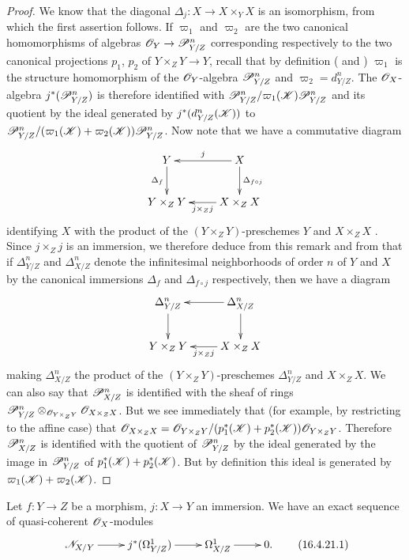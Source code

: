 \begin{proof}
We know  that the diagonal $\Delta_j:X \to X \times_Y X$ is an isomorphism, from which the first assertion follows.
If $\varpi_1$ and $\varpi_2$ are the two canonical homomorphisms of algebras $\sh{O}_Y \to \sh{P}_{Y/Z}^n$ corresponding respectively to the two canonical projections $p_1$, $p_2$ of $Y \times_Z Y \to Y$, recall that by definition ( and ) $\varpi_1$ is the structure homomorphism of the $\mathscr{O}_Y$-algebra $\mathscr{P}_{Y/Z}^n$ and $\varpi_2 = d_{Y/Z}^n$.
The $\mathscr{O}_X$-algebra $j^*(\mathscr{P}_{Y/Z}^n)$ is therefore identified with $\mathscr{P}_{Y/Z}^n/\varpi_1(\mathscr{K})\mathscr{P}_{Y/Z}^n$ and its quotient by the ideal generated by $j^*(d_{Y/Z}^n(\mathscr{K}))$ to $\mathscr{P}_{Y/Z}^n/(\varpi_1(\mathscr{K}) + \varpi_2(\mathscr{K}))\mathscr{P}_{Y/Z}^n$.
Now note that we have a commutative diagram
\[
  \xymatrix{
  Y \ar[d]_-{\Delta_f} & X \ar[d]^-{\Delta_{f \circ j}} \ar[l]_-{j}  \\
  Y \times_Z Y & X \times_Z X \ar[l]^-{j \times_Z j} 
  }
\]
identifying $X$ with the product of the $(Y \times_Z Y)$-preschemes $Y$ and $X \times_Z X$ .
Since $j \times_Z j$ is an immersion, we therefore deduce from this remark and from  that if $\Delta_{Y/Z}^n$ and $\Delta_{X/Z}^n$ denote the infinitesimal neighborhoods of order $n$ of $Y$ and $X$ by the canonical immersions $\Delta_f$ and $\Delta_{f\circ j}$ respectively, then we have a diagram
\[
  \xymatrix{
  \Delta_{Y/Z}^n \ar[d] & \Delta_{X/Z}^n \ar[d] \ar[l]  \\
  Y \times_Z Y & X \times_Z X \ar[l]^-{j \times_Z j} 
  }
\]
making $\Delta_{X/Z}^n$ the product of the $(Y \times_Z Y)$-preschemes $\Delta_{Y/Z}^n$ and $X \times_Z X$.
We can also say that $\mathscr{P}_{X/Z}^n$ is identified with the sheaf of rings $\mathscr{P}_{Y/Z}^n \otimes_{\mathscr{O}_{Y \times_Z Y}} \mathscr{O}_{X \times_Z X}$.
But we see immediately that (for example, by restricting to the affine case) that $\mathscr{O}_{X \times_Z X} = \mathscr{O}_{Y \times_Z Y}/(p_1^*(\mathscr{K}) + p_2^*(\mathscr{K}))\mathscr{O}_{Y \times_Z Y}$.
Therefore $\mathscr{P}_{X/Z}^n$ is identified with the quotient of $\mathscr{P}_{Y/Z}^n$ by the ideal generated by the image in $\mathscr{P}_{Y/Z}^n$ of $p_1^*(\mathscr{K}) + p_2^*(\mathscr{K})$.
But by definition this ideal is generated by $\varpi_1(\mathscr{K}) + \varpi_2(\mathscr{K})$. 
\end{proof}

\begin{corollary}[16.4.21]
\label{IV.16.4.21}
Let $f:Y \to Z$ be a morphism, $j: X \to Y$ an immersion.
We have an exact sequence of quasi-coherent $\mathscr{O}_X$-modules
\[
  \label{IV.16.4.21.1}
  \xymatrix{
    \sh{N}_{X/Y} \ar[r] & j^*(\Omega_{Y/Z}^1) \ar[r] & \Omega_{X/Z}^1 \ar[r] & 0.
  }
  \tag{16.4.21.1}
\]
\end{corollary}

